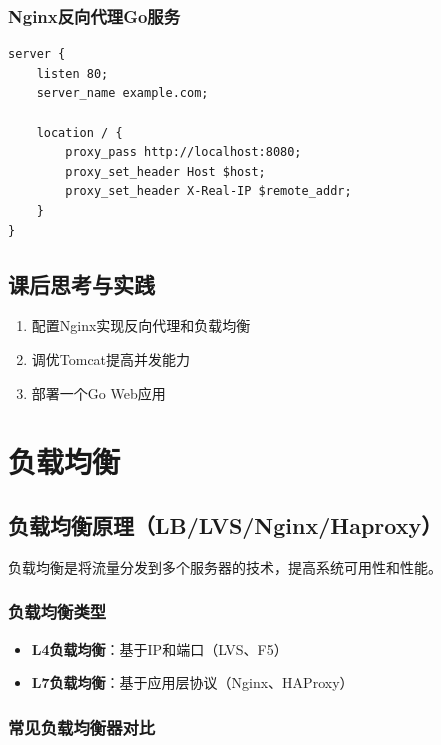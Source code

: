\documentclass[12pt,UTF8]{ctexbook}
\begin{document}
\subsection*{Nginx反向代理Go服务}
\begin{lstlisting}
server {
    listen 80;
    server_name example.com;
    
    location / {
        proxy_pass http://localhost:8080;
        proxy_set_header Host $host;
        proxy_set_header X-Real-IP $remote_addr;
    }
}
\end{lstlisting}

\section{课后思考与实践}
\label{sec:web-services-practice}
\begin{enumerate}
    \item 配置Nginx实现反向代理和负载均衡
    \item 调优Tomcat提高并发能力
    \item 部署一个Go Web应用
\end{enumerate}

\chapter{负载均衡}
\label{chap:load-balancing}

\section{负载均衡原理（LB/LVS/Nginx/Haproxy）}
\label{sec:lb-principles}

负载均衡是将流量分发到多个服务器的技术，提高系统可用性和性能。

\subsection*{负载均衡类型}
\begin{itemize}
    \item \textbf{L4负载均衡}：基于IP和端口（LVS、F5）
    \item \textbf{L7负载均衡}：基于应用层协议（Nginx、HAProxy）
\end{itemize}

\subsection*{常见负载均衡器对比}
\end{document}
